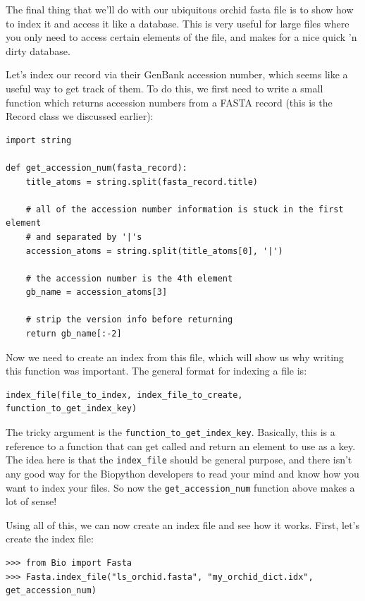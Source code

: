 \documentclass{report}
\begin{document}
The final thing that we'll do with our ubiquitous orchid fasta file is to show how to index it and access it like a database. This is very useful for large files where you only need to access certain elements of the file, and makes for a nice quick 'n dirty database.


Let's index our record via their GenBank accession number, which seems like a useful way to get track of them. To do this, we first need to write a small function which returns accession numbers from a FASTA record (this is the Record class we discussed earlier):

\begin{verbatim}
import string

def get_accession_num(fasta_record):
    title_atoms = string.split(fasta_record.title)

    # all of the accession number information is stuck in the first element
    # and separated by '|'s
    accession_atoms = string.split(title_atoms[0], '|')
 
    # the accession number is the 4th element
    gb_name = accession_atoms[3]

    # strip the version info before returning
    return gb_name[:-2]
\end{verbatim}

Now we need to create an index from this file, which will show us why writing this function was important. The general format for indexing a file is:

\begin{verbatim}
index_file(file_to_index, index_file_to_create, function_to_get_index_key)
\end{verbatim}

The tricky argument is the \verb|function_to_get_index_key|. Basically, this is a reference to a function that can get called and return an element to use as a key. The idea here is that the \verb|index_file| should be general purpose, and there isn't any good way for the Biopython developers to read your mind and know how you want to index your files. So now the \verb|get_accession_num| function above makes a lot of sense!


Using all of this, we can now create an index file and see how it works. First, let's create the index file:

\begin{verbatim}
>>> from Bio import Fasta 
>>> Fasta.index_file("ls_orchid.fasta", "my_orchid_dict.idx", get_accession_num)
\end{verbatim}
\end{document}
